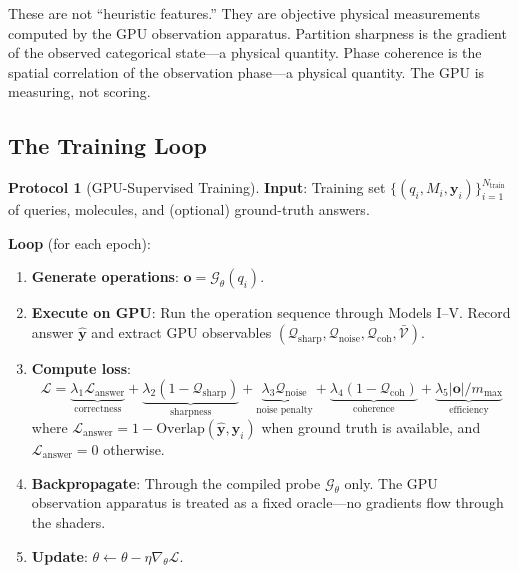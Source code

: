 \documentclass[11pt,twocolumn,a4paper]{article}
\theoremstyle{definition}
\newtheorem{protocol}[theorem]{Protocol}
\theoremstyle{remark}
\newcommand{\Loss}{\mathcal{L}}
\begin{document}
These are not ``heuristic features.'' They are objective physical measurements computed by the GPU observation apparatus. Partition sharpness is the gradient of the observed categorical state---a physical quantity. Phase coherence is the spatial correlation of the observation phase---a physical quantity. The GPU is measuring, not scoring.

\subsection{The Training Loop}

\begin{protocol}[GPU-Supervised Training]
\label{prot:gpu_training}
\textbf{Input}: Training set $\{(q_i, M_i, \mathbf{y}_i)\}_{i=1}^{N_{\mathrm{train}}}$ of queries, molecules, and (optional) ground-truth answers.

\textbf{Loop} (for each epoch):
\begin{enumerate}[nosep]
\item \textbf{Generate operations}: $\mathbf{o} = \mathcal{G}_\theta(q_i)$.
\item \textbf{Execute on GPU}: Run the operation sequence through Models I--V. Record answer $\hat{\mathbf{y}}$ and extract GPU observables $(\mathcal{Q}_{\mathrm{sharp}}, \mathcal{Q}_{\mathrm{noise}}, \mathcal{Q}_{\mathrm{coh}}, \bar{\mathcal{V}})$.
\item \textbf{Compute loss}:
\begin{equation}
\Loss = \underbrace{\lambda_1 \Loss_{\mathrm{answer}}}_{\text{correctness}} + \underbrace{\lambda_2 (1 - \mathcal{Q}_{\mathrm{sharp}})}_{\text{sharpness}} + \underbrace{\lambda_3 \mathcal{Q}_{\mathrm{noise}}}_{\text{noise penalty}} + \underbrace{\lambda_4 (1 - \mathcal{Q}_{\mathrm{coh}})}_{\text{coherence}} + \underbrace{\lambda_5 |\mathbf{o}|/m_{\max}}_{\text{efficiency}}
\label{eq:training_loss}
\end{equation}
where $\Loss_{\mathrm{answer}} = 1 - \mathrm{Overlap}(\hat{\mathbf{y}}, \mathbf{y}_i)$ when ground truth is available, and $\Loss_{\mathrm{answer}} = 0$ otherwise.
\item \textbf{Backpropagate}: Through the compiled probe $\mathcal{G}_\theta$ only. The GPU observation apparatus is treated as a fixed oracle---no gradients flow through the shaders.
\item \textbf{Update}: $\theta \leftarrow \theta - \eta \nabla_\theta \Loss$.
\end{enumerate}
\end{protocol}
\end{document}

